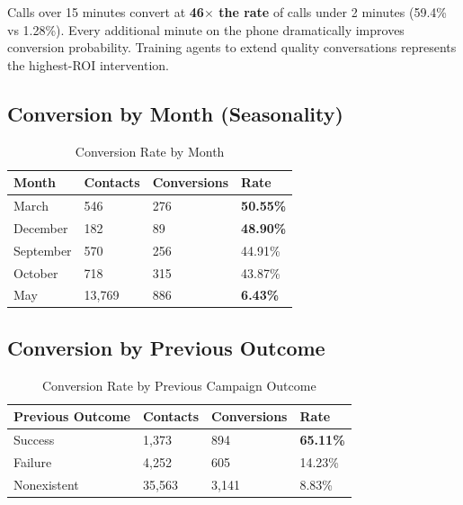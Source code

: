 \documentclass[11pt,a4paper]{article}
\begin{document}
\begin{tcolorbox}[
    colback{dropred!5},
    colframe{dropred!60},
    title=\textbf{Critical: Call Duration is the \#1 Predictor},
    fonttitle=\bfseries,
    arc=6pt
]
Calls over 15 minutes convert at \textbf{46$\times$ the rate} of calls under 2 minutes (59.4\% vs 1.28\%). Every additional minute on the phone dramatically improves conversion probability. Training agents to extend quality conversations represents the highest-ROI intervention.
\end{tcolorbox}

\subsection{Conversion by Month (Seasonality)}

\begin{table}[H]
\centering
\begin{tabular}{p{4cm} p{2.5cm} p{2.5cm} p{2.5cm}}
\toprule
\rowcolor{primary!10}
\textbf{Month} & \textbf{Contacts} & \textbf{Conversions} & \textbf{Rate} \\
\midrule
\rowcolor{conversiongreen!15}
March & 546 & 276 & \textcolor{conversiongreen}{\textbf{50.55\%}} \\
December & 182 & 89 & \textcolor{conversiongreen}{\textbf{48.90\%}} \\
September & 570 & 256 & 44.91\% \\
October & 718 & 315 & 43.87\% \\
\rowcolor{dropred!15}
May & 13,769 & 886 & \textcolor{dropred}{\textbf{6.43\%}} \\
\bottomrule
\end{tabular}
\caption{Conversion Rate by Month}
\end{table}

\subsection{Conversion by Previous Outcome}

\begin{table}[H]
\centering
\begin{tabular}{p{4cm} p{2.5cm} p{2.5cm} p{2.5cm}}
\toprule
\rowcolor{primary!10}
\textbf{Previous Outcome} & \textbf{Contacts} & \textbf{Conversions} & \textbf{Rate} \\
\midrule
\rowcolor{conversiongreen!15}
Success & 1,373 & 894 & \textcolor{conversiongreen}{\textbf{65.11\%}} \\
Failure & 4,252 & 605 & 14.23\% \\
Nonexistent & 35,563 & 3,141 & 8.83\% \\
\bottomrule
\end{tabular}
\caption{Conversion Rate by Previous Campaign Outcome}
\end{table}
\end{document}
